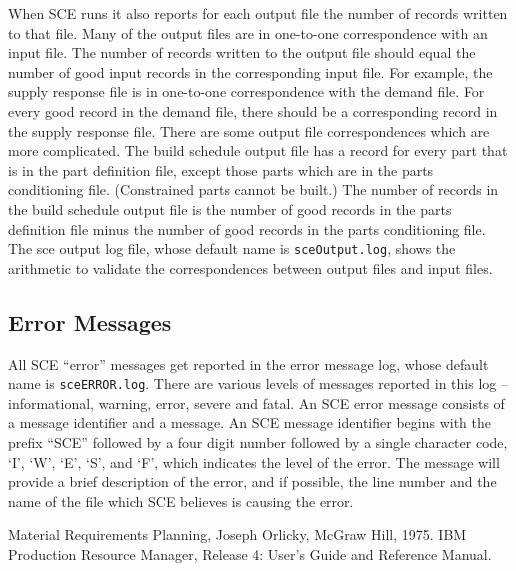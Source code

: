 When SCE runs it also reports for each output file the number of records
written to that file.  Many of the output files are in one-to-one 
correspondence with an input file.  The number of records written to the
output file should equal the number of good input records in the 
corresponding input file.  For example, the supply response file is in 
one-to-one correspondence with the demand file.  For every good record
in the demand file, there should be a corresponding record in the
supply response file.  There are some output file correspondences which
are more complicated.  The build schedule output file has a record for
every part that is in the part definition file, except those parts which
are in the parts conditioning file.  (Constrained parts cannot be built.)
The number of records in the build schedule output file is the number of
good records in the parts definition file minus the number of good records
in the parts conditioning file.  The sce output log file, whose default name
is {\tt sceOutput.log}, shows the arithmetic to validate the correspondences
between output files and input files.

\subsection{Error Messages}
All SCE ``error'' messages get reported in the error message log, whose
default name is {\tt sceERROR.log}.  There are various levels of messages
reported in this log -- informational, warning, error, severe and fatal.
An SCE error message consists of a message identifier and a message.
An SCE message identifier begins with the prefix ``SCE'' followed by a 
four digit number followed by a single character code, `I', `W', `E', `S',
and `F', which indicates the level of the error.  The message will provide
a brief description of the error, and if possible, the line number and 
the name of the file which SCE believes is causing the error.


\begin{thebibliography}{99}
 Material Requirements Planning, Joseph Orlicky, McGraw Hill,
1975.
 IBM Production Resource Manager, Release 4: User's Guide
and Reference Manual.
\end{thebibliography}

 
